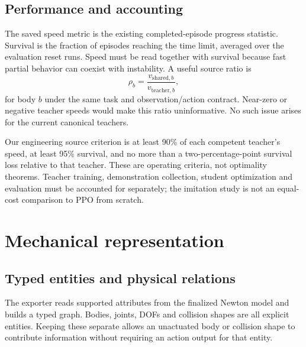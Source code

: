 \documentclass[11pt,letterpaper]{article}
\begin{document}
\subsection{Performance and accounting}
The saved speed metric is the existing completed-episode progress statistic.
Survival is the fraction of episodes reaching the time limit, averaged over the
evaluation reset runs. Speed must be read together with survival because fast
partial behavior can coexist with instability. A useful source ratio is
\begin{equation}
  \rho_b=\frac{v_{\text{shared},b}}{v_{\text{teacher},b}},
\end{equation}
for body $b$ under the same task and observation/action contract. Near-zero or
negative teacher speeds would make this ratio uninformative. No such issue
arises for the current canonical teachers.

Our engineering source criterion is at least 90\% of each competent teacher's
speed, at least 95\% survival, and no more than a two-percentage-point survival
loss relative to that teacher. These are operating criteria, not optimality
theorems. Teacher training, demonstration collection, student optimization and
evaluation must be accounted for separately; the imitation study is not an
equal-cost comparison to PPO from scratch.

\section{Mechanical representation}
\label{sec:representation}

\subsection{Typed entities and physical relations}
The exporter reads supported attributes from the finalized Newton model and
builds a typed graph. Bodies, joints, DOFs and collision shapes are all explicit
entities. Keeping these separate allows an unactuated body or collision shape to
contribute information without requiring an action output for that entity.
\end{document}
